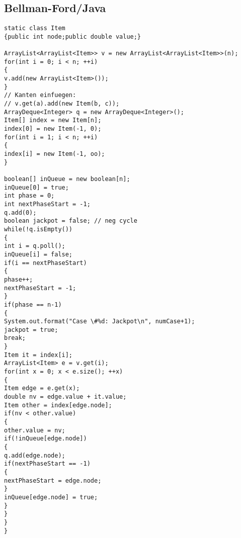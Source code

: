 \subsection{Bellman-Ford/Java}
\begin{lstlisting}
static class Item
{public int node;public double value;}

ArrayList<ArrayList<Item>> v = new ArrayList<ArrayList<Item>>(n);
for(int i = 0; i < n; ++i)
{
v.add(new ArrayList<Item>());
}
// Kanten einfuegen:
// v.get(a).add(new Item(b, c));
ArrayDeque<Integer> q = new ArrayDeque<Integer>();
Item[] index = new Item[n];
index[0] = new Item(-1, 0);
for(int i = 1; i < n; ++i)
{
index[i] = new Item(-1, oo);
}

boolean[] inQueue = new boolean[n];
inQueue[0] = true;
int phase = 0;
int nextPhaseStart = -1;
q.add(0);
boolean jackpot = false; // neg cycle
while(!q.isEmpty())
{
int i = q.poll();
inQueue[i] = false;
if(i == nextPhaseStart)
{
phase++;
nextPhaseStart = -1;
}
if(phase == n-1)
{
System.out.format("Case \#%d: Jackpot\n", numCase+1);
jackpot = true;
break;
}
Item it = index[i];
ArrayList<Item> e = v.get(i);
for(int x = 0; x < e.size(); ++x)
{
Item edge = e.get(x);
double nv = edge.value + it.value;
Item other = index[edge.node];
if(nv < other.value)
{
other.value = nv;
if(!inQueue[edge.node])
{
q.add(edge.node);
if(nextPhaseStart == -1)
{
nextPhaseStart = edge.node;
}
inQueue[edge.node] = true;
}
}
}
}
\end{lstlisting}